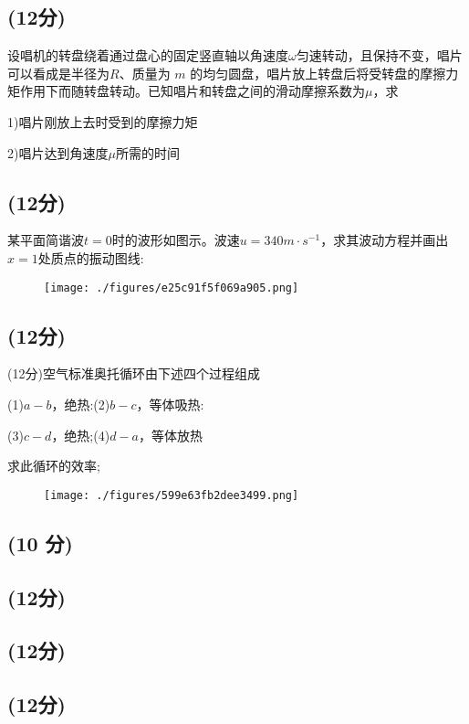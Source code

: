 \subsection{(12分)}
设唱机的转盘绕着通过盘心的固定竖直轴以角速度$\omega$匀速转动，且保持不变，唱片可以看成是半径为$R$、质量为 $m$ 的均匀圆盘，唱片放上转盘后将受转盘的摩擦力矩作用下而随转盘转动。已知唱片和转盘之间的滑动摩擦系数为$\mu$，求

1)唱片刚放上去时受到的摩擦力矩

2)唱片达到角速度$\mu$所需的时间
\subsection{(12分)}
某平面简谐波$t=0$时的波形如图示。波速$u=340m\cdot s^{-1}$，求其波动方程并画出$x=1$处质点的振动图线:
\begin{figure}[ht]
\centering
\texttt{[image: ./figures/e25c91f5f069a905.png]}
\caption{} \label{fig_NJU07_4}
\end{figure}
\subsection{(12分)}
(12分)空气标准奥托循环由下述四个过程组成

(1)$a-b$，绝热:(2)$b-c$，等体吸热:

(3)$c-d$，绝热;(4)$d-a$，等体放热

求此循环的效率;
\begin{figure}[ht]
\centering
\texttt{[image: ./figures/599e63fb2dee3499.png]}
\caption{} \label{fig_NJU07_5}
\end{figure}
\subsection{(10 分)}

\subsection{(12分)}

\subsection{(12分)}

\subsection{(12分)}